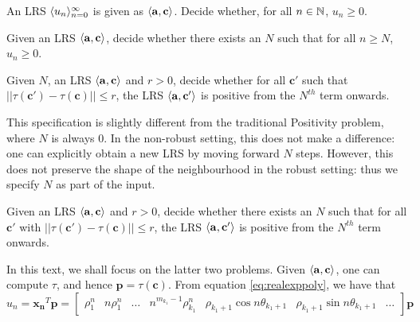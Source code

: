 \begin{problem}[Positivity]
\label{prob:pos}
An LRS $\langle u_n\rangle_{n=0}^\infty$ is given as $\langle\mathbf{a}, \mathbf{c}\rangle$. Decide whether, for all $n \in \mathbb{N}$, $u_n \ge 0$.
\end{problem}

\begin{problem}
\label{prob:ultpos}
Given an LRS $\langle\mathbf{a}, \mathbf{c}\rangle$, decide whether there exists an $N$ such that for all $n \ge N$, $u_n \ge 0$.
\end{problem}

\begin{problem}
\label{prob:rrobpos}
Given $N$, an LRS $\langle\mathbf{a}, \mathbf{c}\rangle$ and $r > 0$, decide whether for all $\mathbf{c'}$ such that \\$||\tau(\mathbf{c'}) - \tau(\mathbf{c})|| \le r$, the LRS $\langle\mathbf{a}, \mathbf{c'}\rangle$ is positive from the $N^{th}$ term onwards.
\end{problem}

This specification is slightly different from the traditional Positivity problem, where $N$ is always $0$. In the non-robust setting, this does not make a difference: one can explicitly obtain a new LRS by moving forward $N$ steps. However, this does not preserve the shape of the neighbourhood in the robust setting: thus we specify $N$ as part of the input.

\begin{problem}
\label{prob:rrobuniultpos}
Given an LRS $\langle\mathbf{a}, \mathbf{c}\rangle$ and $r > 0$, decide whether there exists an $N$ such that for all $\mathbf{c'}$ with $||\tau(\mathbf{c'}) - \tau(\mathbf{c})|| \le r$, the LRS $\langle\mathbf{a}, \mathbf{c'}\rangle$ is positive from the $N^{th}$ term onwards.
\end{problem}

In this text, we shall focus on the latter two problems. Given $\langle\mathbf{a}, \mathbf{c}\rangle$, one can compute $\tau$, and hence $\mathbf{p} = \tau(\mathbf{c})$. From equation \ref{eq:realexppoly}, we have that 
\begin{equation}
\label{eq:innerprod}
u_n = \mathbf{x_n}^T\mathbf{p} = 
\begin{bmatrix}
\rho_1^n & n \rho_1^n & \dots & n^{m_{k_1}-1}\rho_{k_1}^n & \rho_{k_1+1}\cos n\theta_{k_1+1} & \rho_{k_1+1}\sin n\theta_{k_1+1} & \dots
\end{bmatrix}\mathbf{p}
\end{equation}

